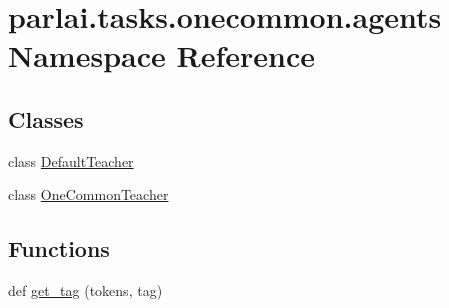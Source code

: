 \hypertarget{namespaceparlai_1_1tasks_1_1onecommon_1_1agents}{}\section{parlai.\+tasks.\+onecommon.\+agents Namespace Reference}
\label{namespaceparlai_1_1tasks_1_1onecommon_1_1agents}
\subsection*{Classes}
\begin{DoxyCompactItemize}
\item 
class \hyperlink{classparlai_1_1tasks_1_1onecommon_1_1agents_1_1DefaultTeacher}{Default\+Teacher}
\item 
class \hyperlink{classparlai_1_1tasks_1_1onecommon_1_1agents_1_1OneCommonTeacher}{One\+Common\+Teacher}
\end{DoxyCompactItemize}
\subsection*{Functions}
\begin{DoxyCompactItemize}
\item 
def \hyperlink{namespaceparlai_1_1tasks_1_1onecommon_1_1agents_ad40f47306fdc2563ccac42a81c5620f6}{get\+\_\+tag} (tokens, tag)
\end{DoxyCompactItemize}
